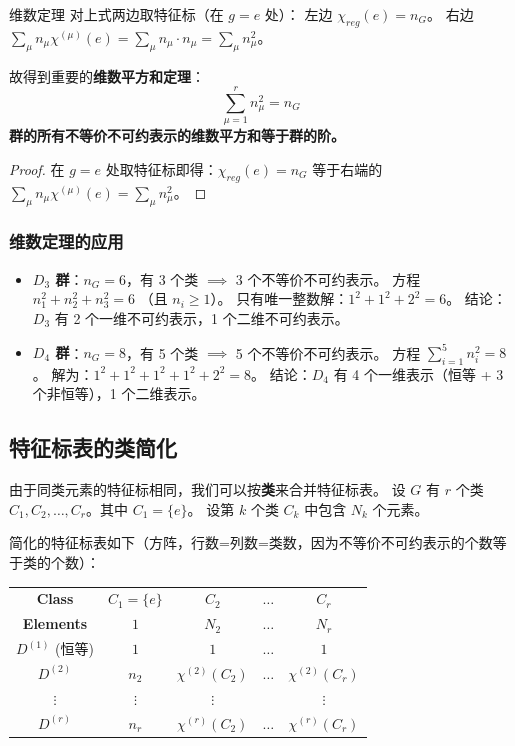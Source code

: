 \begin{corollary}{维数定理}
    对上式两边取特征标（在 $g=e$ 处）：
    左边 $\chi_{reg}(e) = n_G$。
    右边 $\sum_{\mu} n_\mu \chi^{(\mu)}(e) = \sum_{\mu} n_\mu \cdot n_\mu = \sum_{\mu} n_\mu^2$。
    
    故得到重要的\textbf{维数平方和定理}：
    \begin{equation}
        \sum_{\mu=1}^r n_\mu^2 = n_G
    \end{equation}
    \textbf{群的所有不等价不可约表示的维数平方和等于群的阶。}
\end{corollary}
\begin{proof}
    在 $g=e$ 处取特征标即得：$\chi_{reg}(e)=n_G$ 等于右端的 $\sum_\mu n_\mu\chi^{(\mu)}(e)=\sum_\mu n_\mu^2$。
\end{proof}

\subsubsection{维数定理的应用}
\begin{itemize}
    \item \textbf{$D_3$ 群}：$n_G = 6$，有 3 个类 $\implies$ 3 个不等价不可约表示。
    方程 $n_1^2 + n_2^2 + n_3^2 = 6$ （且 $n_i \ge 1$）。
    只有唯一整数解：$1^2 + 1^2 + 2^2 = 6$。
    结论：$D_3$ 有 2 个一维不可约表示，1 个二维不可约表示。
    
    \item \textbf{$D_4$ 群}：$n_G = 8$，有 5 个类 $\implies$ 5 个不等价不可约表示。
    方程 $\sum_{i=1}^5 n_i^2 = 8$。
    解为：$1^2 + 1^2 + 1^2 + 1^2 + 2^2 = 8$。
    结论：$D_4$ 有 4 个一维表示（恒等 + 3 个非恒等），1 个二维表示。
\end{itemize}

\subsection{特征标表的类简化}
由于同类元素的特征标相同，我们可以按\textbf{类}来合并特征标表。
设 $G$ 有 $r$ 个类 $C_1, C_2, \dots, C_r$。其中 $C_1 = \{e\}$。
设第 $k$ 个类 $C_k$ 中包含 $N_k$ 个元素。

简化的特征标表如下（方阵，行数=列数=类数，因为不等价不可约表示的个数等于类的个数）：
\begin{center}
\begin{tabular}{c|cccc}
    \textbf{Class} & $C_1=\{e\}$ & $C_2$ & $\dots$ & $C_r$ \\
    \textbf{Elements} & $1$ & $N_2$ & $\dots$ & $N_r$ \\
    \hline
    $D^{(1)}$ (恒等) & $1$ & $1$ & $\dots$ & $1$ \\
    $D^{(2)}$ & $n_2$ & $\chi^{(2)}(C_2)$ & $\dots$ & $\chi^{(2)}(C_r)$ \\
    $\vdots$ & $\vdots$ & $\vdots$ & & $\vdots$ \\
    $D^{(r)}$ & $n_r$ & $\chi^{(r)}(C_2)$ & $\dots$ & $\chi^{(r)}(C_r)$ \\
\end{tabular}
\end{center}

